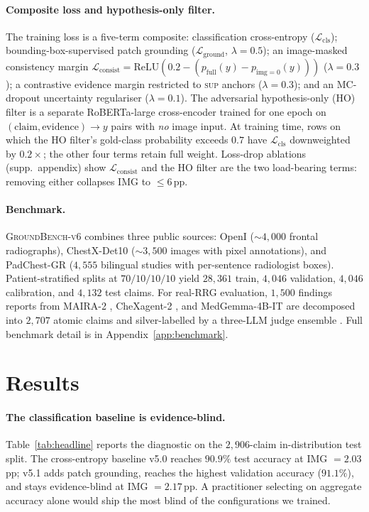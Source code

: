 \documentclass{article}
\begin{document}
\paragraph{Composite loss and hypothesis-only filter.} The training
loss is a five-term composite: classification cross-entropy
($\mathcal{L}_{\mathrm{cls}}$); bounding-box-supervised patch
grounding ($\mathcal{L}_{\mathrm{ground}}$, $\lambda = 0.5$); an
image-masked consistency margin
$\mathcal{L}_{\mathrm{consist}} = \mathrm{ReLU}(0.2 - (p_{\mathrm{full}}(y)
- p_{\mathrm{img}=0}(y)))$ ($\lambda = 0.3$); a contrastive evidence
margin restricted to \textsc{sup} anchors ($\lambda = 0.3$); and an
MC-dropout uncertainty regulariser ($\lambda = 0.1$). The adversarial
hypothesis-only (HO) filter is a separate RoBERTa-large cross-encoder
trained for one epoch on $(\text{claim}, \text{evidence}) \to y$
pairs with \emph{no} image input. At training time, rows on which
the HO filter's gold-class probability exceeds $0.7$ have
$\mathcal{L}_{\mathrm{cls}}$ downweighted by $0.2\times$; the other
four terms retain full weight. Loss-drop ablations
(supp.\ appendix) show $\mathcal{L}_{\mathrm{consist}}$
and the HO filter are the two load-bearing terms: removing either
collapses IMG to $\leq 6$\,pp.

\paragraph{Benchmark.} \textsc{GroundBench-v6} combines three public
sources: OpenI \citep{demner2016openi} ($\sim 4{,}000$ frontal
radiographs), ChestX-Det10 \citep{liu2020chestxdet} ($\sim 3{,}500$
images with pixel annotations), and PadChest-GR
\citep{castro2024padchestgr} ($4{,}555$ bilingual studies with
per-sentence radiologist boxes). Patient-stratified splits at
$70/10/10/10$ yield $28{,}361$ train, $4{,}046$ validation,
$4{,}046$ calibration, and $4{,}132$ test claims. For real-RRG
evaluation, $1{,}500$ findings reports from MAIRA-2
\citep{bannur2024maira2}, CheXagent-2 \citep{chen2024chexagent}, and
MedGemma-4B-IT \citep{google2024medgemma} are decomposed into
$2{,}707$ atomic claims and silver-labelled by a three-LLM judge
ensemble \citep{ostmeier2024green}. Full benchmark detail is in
Appendix~\ref{app:benchmark}.

\section{Results}
\label{sec:results}

\paragraph{The classification baseline is evidence-blind.}
Table~\ref{tab:headline} reports the diagnostic on the
$2{,}906$-claim in-distribution test split. The cross-entropy
baseline v5.0 reaches $90.9\%$ test accuracy at IMG $= 2.03$\,pp;
v5.1 adds patch grounding, reaches the highest validation accuracy
($91.1\%$), and stays evidence-blind at IMG $= 2.17$\,pp. A
practitioner selecting on aggregate accuracy alone would ship the
most blind of the configurations we trained.
\end{document}
